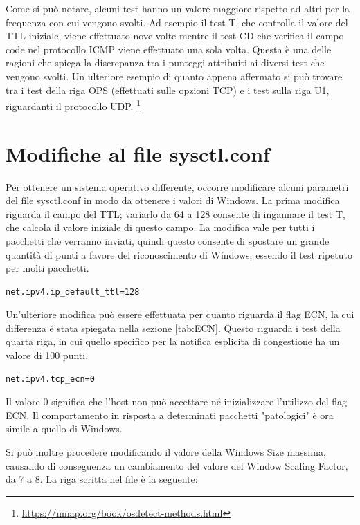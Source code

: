 Come si può notare, alcuni test hanno un valore maggiore rispetto ad altri per la frequenza con cui vengono svolti. Ad esempio il test T, che controlla il valore del TTL iniziale, viene effettuato nove volte mentre il test CD che verifica il campo code nel protocollo ICMP viene effettuato una sola volta.
Questa è una delle ragioni che spiega la discrepanza tra i punteggi attribuiti ai diversi test che vengono svolti.
Un ulteriore esempio di quanto appena affermato si può trovare tra i test della riga OPS (effettuati sulle opzioni TCP) e i test sulla riga U1, riguardanti il protocollo UDP. \footnote{\url{https://nmap.org/book/osdetect-methods.html}}


\section{Modifiche al file sysctl.conf}
Per ottenere un sistema operativo differente, occorre modificare alcuni parametri del file sysctl.conf in modo da ottenere i valori di Windows.
La prima modifica riguarda il campo del TTL; variarlo da 64 a 128 consente di ingannare il test T, che calcola il valore iniziale di questo campo. La modifica vale per tutti i pacchetti che verranno inviati, quindi questo consente di spostare un grande quantità di punti a favore del riconoscimento di Windows, essendo il test ripetuto per molti pacchetti.

\begin{lstlisting}[caption={Modifica al campo TTL nel file sysctl.conf}, label=listing_ttl]
	net.ipv4.ip_default_ttl=128
\end{lstlisting}

Un'ulteriore modifica può essere effettuata per quanto riguarda il flag ECN, la cui differenza è stata spiegata nella sezione \ref{tab:ECN}. Questo riguarda i test della quarta riga, in cui quello specifico per la notifica esplicita di congestione ha un valore di 100 punti.

\begin{lstlisting}[caption={Modifica al campo ECN nel file sysctl.conf}]
	net.ipv4.tcp_ecn=0
\end{lstlisting} 

Il valore 0 significa che l'host non può accettare né inizializzare l'utilizzo del flag ECN. Il comportamento in risposta a determinati pacchetti "patologici" è ora simile a quello di Windows.

Si può inoltre procedere modificando il valore della Windows Size massima, causando di conseguenza un cambiamento del valore del Window Scaling Factor, da 7 a 8. 
La riga scritta nel file è la seguente:

